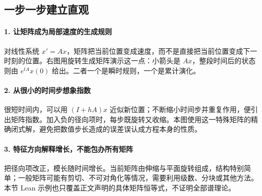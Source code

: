 \subsection*{一步一步建立直观}

\paragraph{1. 让矩阵成为局部速度的生成规则}

对线性系统 $x'=Ax$，矩阵把当前位置变成速度，而不是直接把当前位置变成下一时刻的位置。右图用旋转生成矩阵演示这一点：小箭头是 $Ax$，整段时间后的状态则由 $e^{tA}x(0)$ 给出。二者一个是瞬时规则，一个是累计演化。



\paragraph{2. 从很小的时间步想象指数}

很短时间内，可以用 $(I+hA)x$ 近似新位置；不断缩小时间步并重复作用，便引出矩阵指数。加入负的径向项时，每步既旋转又收缩。本图使用这一特殊矩阵的精确闭式解，避免把数值步长造成的误差误认成方程本身的性质。



\paragraph{3. 特征方向解释增长，不能包办所有矩阵}

把径向项改正，模长随时间增长。当前矩阵由伸缩与平面旋转组成，结构特别简单；一般矩阵可能有剪切、不可对角化等情况，需要利用级数、分块或其他方法。本节 Lean 示例也只覆盖正文声明的具体矩阵恒等式，不证明全部谱理论。
